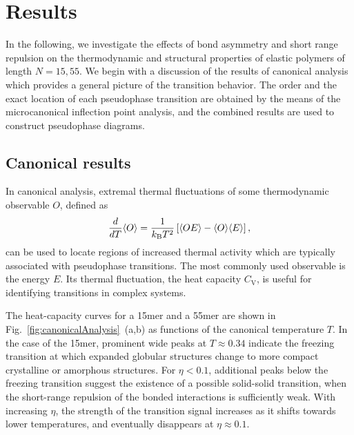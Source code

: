 \documentclass[12pt]{report}
\begin{document}
\section{Results}
%
In the following, we investigate the effects of bond asymmetry and short range repulsion on the thermodynamic and structural properties of elastic polymers of length $N=15,55$.  We begin with a discussion of the results of canonical analysis which provides a general picture of the transition behavior. The order and the exact location of each pseudophase transition are obtained by the means of the microcanonical inflection point analysis, and the combined results are used to construct pseudophase diagrams. 


\subsection{Canonical results}
In canonical analysis, extremal thermal fluctuations of some thermodynamic observable $O$, defined as
%
\begin{equation}
    \frac{d}{d T}\langle O\rangle = \frac{1}{k_{\rm B}T^2} \left[ \langle O E 
    \rangle-\langle O\rangle\langle E\rangle \right],
    \label{eq:fluctuation}
\end{equation}
%
can be used to locate regions of increased thermal activity which are typically associated with pseudophase transitions. The most commonly used observable is the energy $E$. Its thermal fluctuation, the heat capacity $C_{\mathrm{V}}$, is useful for identifying transitions in complex systems. 

The heat-capacity curves for a 15mer and a 55mer are shown in Fig.~\ref{fig:canonicalAnalysis}~(a,b) as functions of the canonical temperature $T$. In the case of the 15mer, prominent wide peaks at $T \approx 0.34$ indicate the freezing transition at which expanded globular structures change to more compact crystalline or amorphous structures. For $\eta < 0.1$, additional peaks below the freezing transition suggest the existence of a possible solid-solid transition, when the short-range repulsion of the bonded interactions is sufficiently weak. With increasing $\eta$, the strength of the transition signal increases as it shifts towards lower temperatures, and eventually disappears at $\eta \approx 0.1$. 
\end{document}
